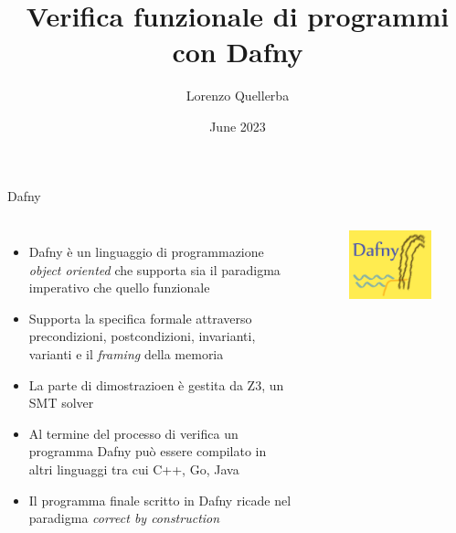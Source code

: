 \documentclass{beamer}
\title{Verifica funzionale di programmi con Dafny}
\author{Lorenzo Quellerba}
\institute{Univeristà degli Studi di Torino}
\date{June 2023}
\begin{document}
\maketitle


\begin{frame}{Dafny}
    \begin{columns}[onlytextwidth]
        \begin{itemize}
            \item Dafny è un linguaggio di programmazione \textit{object oriented} che supporta sia il paradigma imperativo che quello funzionale
            \item Supporta la specifica formale attraverso precondizioni, postcondizioni, invarianti, varianti e il \textit{framing} della memoria
            \item La parte di dimostrazioen è gestita da Z3, un SMT solver
            \item Al termine del processo di verifica un programma Dafny può essere compilato in altri linguaggi tra cui C++, Go, Java
            \item Il programma finale scritto in Dafny ricade nel paradigma \textit{correct by construction}
        \end{itemize}
        \begin{figure}
            \includegraphics[scale=0.4]{./assets/images/dafny-logo-230.png}
        \end{figure}
    \end{columns}
\end{frame}
\end{document}
